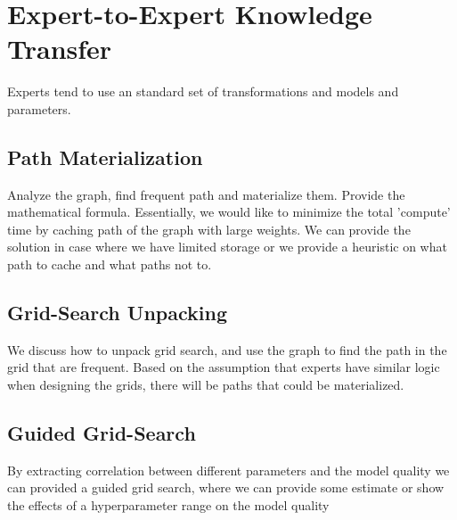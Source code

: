 \section{Expert-to-Expert Knowledge Transfer} \label{sec-expert-expert}
Experts tend to use an standard set of transformations and models and parameters.

\subsection{Path Materialization}
Analyze the graph, find frequent path and materialize them.
Provide the mathematical formula.
Essentially, we would like to minimize the total 'compute' time by caching path of the graph with large weights.
We can provide the solution in case where we have limited storage or we provide a heuristic on what path to cache and what paths not to.

\subsection{Grid-Search Unpacking}
We discuss how to unpack grid search, and use the graph to find the path in the grid that are frequent.
Based on the assumption that experts have similar logic when designing the grids, there will be paths that could be materialized.

\subsection{Guided Grid-Search}
By extracting correlation between different parameters and the model quality we can provided a guided grid search, where we can provide some estimate or show the effects of a hyperparameter range on the model quality